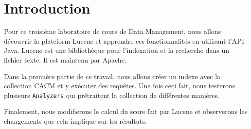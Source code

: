 \chapter*{Introduction}

Pour ce troisième laboratoire de cours de Data Management, nous allons découvrir la plateform Lucene et apprendre ces fonctionnalités en utilisant l'API Java. Lucene est une bibliothèque pour l'indexation et la recherche dans un fichier texte. Il est maintenu par Apache.

Dans la première partie de ce travail, nous allons créer un indexe avec la collection CACM et y exécuter des requêtes. Une fois ceci fait, nous testerons plusieurs \texttt{Analyzers} qui prétraitent la collection de différentes manières. 

Finalement, nous modifierons le calcul du score fait par Lucene et observerons les changements que cela implique sur les résultats.

